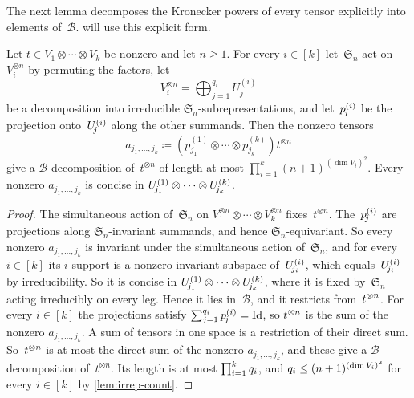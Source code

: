 \documentclass[11pt,letterpaper]{article}
\DeclareMathOperator{\Id}{Id}
\begin{document}
The next lemma decomposes the Kronecker powers of every tensor explicitly into elements of~$\mathcal{B}$.  will use this explicit form.

\begin{lemma}\label{lem:qf-explicit}
Let $t \in V_1 \otimes \cdots \otimes V_k$ be nonzero and let $n \geq 1$. For every $i \in [k]$ let~$\mathfrak{S}_n$ act on~$V_i^{\otimes n}$ by permuting the factors, let
\[
V_i^{\otimes n} = \bigoplus_{j=1}^{q_i} U^{(i)}_j
\]
be a decomposition into irreducible $\mathfrak{S}_n$-subrepresentations, and let~$p^{\smash{(i)}}_{\!j}$ be the projection onto~$U^{\smash{(i)}}_{\!j}$ along the other summands. Then the nonzero tensors 
\[
a_{j_1, \ldots, j_k} \coloneqq (p^{(1)}_{\!j_1} \otimes \cdots \otimes p^{(k)}_{\!j_k}) t^{\otimes n}
\]
give a $\mathcal{B}$-decomposition of~$t^{\otimes n}$ of length at most $\prod_{i=1}^k (n+1)^{(\dim V_i)^2}$. Every nonzero $a_{j_1, \ldots, j_k}$ is concise in $U^{\smash{(1)}}_{\!j_1} \otimes \cdots \otimes U^{\smash{(k)}}_{\!j_k}$.
\end{lemma}
\begin{proof}
The simultaneous action of~$\mathfrak{S}_n$ on $V_1^{\otimes n} \otimes \cdots \otimes V_k^{\otimes n}$ fixes~$t^{\otimes n}$. The~$p^{\smash{(i)}}_{\!j}$ are projections along $\mathfrak{S}_n$-invariant summands, and hence $\mathfrak{S}_n$-equivariant. So every nonzero $a_{j_1, \ldots, j_k}$ is invariant under the simultaneous action of~$\mathfrak{S}_n$, and for every $i \in [k]$ its $i$-support is a nonzero invariant subspace of~$U^{\smash{(i)}}_{\!j_i}$, which equals~$U^{\smash{(i)}}_{\!j_i}$ by irreducibility. So it is concise in $U^{\smash{(1)}}_{\!j_1} \otimes \cdots \otimes U^{\smash{(k)}}_{\!j_k}$, where it is fixed by~$\mathfrak{S}_n$ acting irreducibly on every leg. Hence it lies in~$\mathcal{B}$, and it restricts from~$t^{\smash{\otimes n}}$. For every $i \in [k]$ the projections satisfy $\sum_{j=1}^{q_i} p^{\smash{(i)}}_{\!j} = \Id$, so $t^{\smash{\otimes n}}$ is the sum of the nonzero $a_{j_1, \ldots, j_k}$. A sum of tensors in one space is a restriction of their direct sum. So~$t^{\smash{\otimes n}}$ is at most the direct sum of the nonzero $a_{j_1, \ldots, j_k}$, and these give a $\mathcal{B}$-decomposition of~$t^{\otimes n}$. Its length is at most $\prod_{i=1}^{\smash[t]{k}} q_i$, and $q_i \leq (n+1)^{\smash{(\dim V_i)^2}}$ for every $i \in [k]$ by \cref{lem:irrep-count}.
\end{proof}
\end{document}
